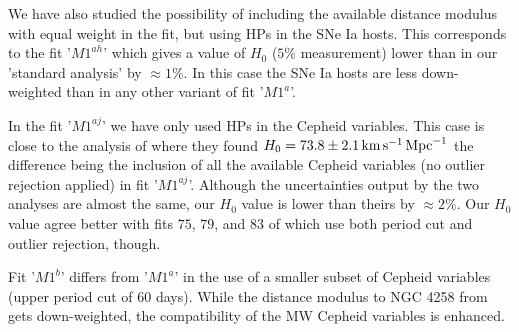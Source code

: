 We have also studied the possibility of including the available distance modulus with equal weight in the fit, but using HPs in the SNe Ia hosts. This corresponds to the fit '$M1^{ah}$' which gives a value of $H_0$ ($5\%$ measurement) lower than in our 'standard analysis' by $\approx 1\%$. In this case the SNe Ia hosts are less down-weighted than in any other variant of fit '$M1^a$'.

In the fit '$M1^{aj}$' we have only used HPs in the Cepheid variables. This case is close to the analysis of \cite{Riess:2011yx} where they found $H_0 = 73.8 \pm 2.1 \, \mathrm{km}\, \mathrm{s}^{-1}\, \mathrm{Mpc}^{-1}$ the difference being the inclusion of all the available Cepheid variables (no outlier rejection applied) in fit '$M1^{aj}$'. Although the uncertainties output by the two analyses are almost the same, our $H_0$ value is lower than theirs by $\approx 2\%$. Our $H_0$ value agree better with fits $75$, $79$, and $83$ of \cite{Efstathiou:2013via} which use both period cut and outlier rejection, though.

Fit '$M1^b$' differs from '$M1^a$' in the use of a smaller subset of Cepheid variables (upper period cut of $60$ days). While the distance modulus to NGC 4258 from \cite{Humphreys:2013eja} gets down-weighted, the compatibility of the MW Cepheid variables is enhanced.






